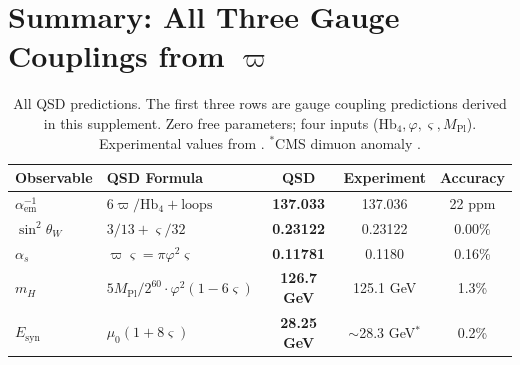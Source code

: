 \documentclass[11pt,a4paper]{article}
\theoremstyle{definition}
\newcommand{\Hbfour}{\mathrm{Hb}_4}
\newcommand{\gs}{\varsigma}
\newcommand{\Mpl}{M_{\text{Pl}}}
\begin{document}
\section{Summary: All Three Gauge Couplings from $\varpi$}
\label{sec:summary}

\begin{table}[h]
\centering
\renewcommand{\arraystretch}{1.5}
\begin{tabular}{llccc}
\toprule
\textbf{Observable} & \textbf{QSD Formula} & \textbf{QSD} & \textbf{Experiment} & \textbf{Accuracy} \\
\midrule
$\alpha^{-1}_{\text{em}}$ & $6\varpi/\Hbfour + \text{loops}$ & \textbf{137.033} & 137.036 & 22 ppm \\
$\sin^2\theta_W$ & $3/13 + \gs/32$ & \textbf{0.23122} & 0.23122 & 0.00\% \\
$\alpha_s$ & $\varpi\gs = \pi\varphi^2\gs$ & \textbf{0.11781} & 0.1180 & 0.16\% \\
\midrule
$m_H$ & $5\Mpl/2^{60} \cdot \varphi^2(1-6\gs)$ & \textbf{126.7 GeV} & 125.1 GeV & 1.3\% \\
$E_{\text{syn}}$ & $\mu_0(1+8\gs)$ & \textbf{28.25 GeV} & $\sim$28.3 GeV$^*$ & 0.2\% \\
\bottomrule
\end{tabular}
\renewcommand{\arraystretch}{1.0}
\caption{All QSD predictions. The first three rows are gauge coupling predictions derived in this supplement. Zero free parameters; four inputs ($\Hbfour, \varphi, \gs, \Mpl$). Experimental values from \cite{PDG2022}. $^*$CMS dimuon anomaly \cite{CMS2018dimuon}.}
\label{tab:summary}
\end{table}
\end{document}

